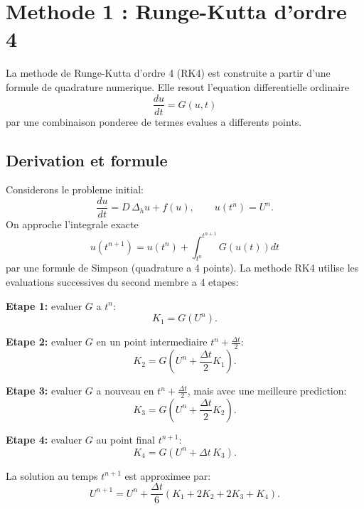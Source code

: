 \documentclass[11pt,a4paper]{report}
\begin{document}
\section{Methode 1 : Runge-Kutta d'ordre 4}
La methode de Runge-Kutta d'ordre 4 (RK4) est construite a partir d'une formule de quadrature
numerique. Elle resout l'equation differentielle ordinaire
\begin{equation}
\frac{du}{dt} = G(u,t)
\end{equation}
par une combinaison ponderee de termes evalues a differents points.

\subsection*{Derivation et formule}
Considerons le probleme initial:
\begin{equation}
\frac{du}{dt} = D\,\Delta_h u + f(u), \qquad u(t^n)=U^n.
\end{equation}
On approche l'integrale exacte
\begin{equation}
u(t^{n+1})=u(t^n) + \int_{t^n}^{t^{n+1}} G(u(t)) dt
\end{equation}
par une formule de Simpson (quadrature a 4 points). La methode RK4 utilise les
evaluations successives du second membre a 4 etapes:

\textbf{Etape 1:} evaluer $G$ a $t^n$:
\begin{equation}
 K_1 = G(U^n).
\end{equation}

\textbf{Etape 2:} evaluer $G$ en un point intermediaire $t^n + \frac{\Delta t}{2}$:
\begin{equation}
 K_2 = G\left(U^n + \frac{\Delta t}{2}K_1\right).
\end{equation}

\textbf{Etape 3:} evaluer $G$ a nouveau en $t^n + \frac{\Delta t}{2}$, mais avec une meilleure prediction:
\begin{equation}
 K_3 = G\left(U^n + \frac{\Delta t}{2}K_2\right).
\end{equation}

\textbf{Etape 4:} evaluer $G$ au point final $t^{n+1}$:
\begin{equation}
 K_4 = G\left(U^n + \Delta t\, K_3\right).
\end{equation}

La solution au temps $t^{n+1}$ est approximee par:
\begin{equation}
 U^{n+1} = U^n + \frac{\Delta t}{6}(K_1 + 2K_2 + 2K_3 + K_4).
\end{equation}
\end{document}
